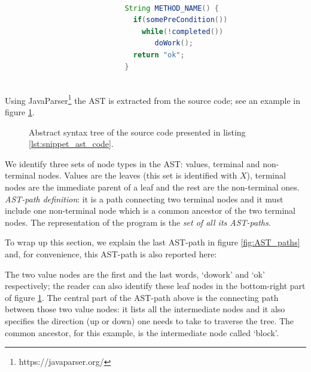 \begin{lstlisting}[caption={Example code to show decomposition}, label={lst:snippet_ast_code},language=Java]

                            String METHOD_NAME() {
                              if(somePreCondition())
                                while(!completed())
                                   doWork();
                              return "ok";
                            }
                            
\end{lstlisting}

Using JavaParser\footnote{https://javaparser.org/} the AST is extracted from the source code; see an example in figure  \ref{fig:AST_graphviz}.


\begin{figure}
 \centering
 \resizebox{\columnwidth}{!}{
 
 }
 \caption[AST for listing \ref{lst:snippet_ast_code}.]{Abstract syntax tree of the source code presented in listing \ref{lst:snippet_ast_code}.}
 \label{fig:AST_graphviz}
\end{figure}

	
We identify three sets of node types in the AST: values, terminal and non-terminal nodes. Values are the leaves (this set is identified with $X$), terminal nodes are the immediate parent of a leaf and the rest are the non-terminal ones.
\textit{AST-path definition}: it is a path connecting two terminal nodes and it must include one non-terminal node which is a common ancestor of the two terminal nodes. 
The representation of the program is the \textit{set of all its AST-paths}. 

To wrap up this section, we explain the last AST-path in figure \ref{fig:AST_paths} and, for convenience, this AST-path is also reported here:

\begin{center}
\end{center}

The two value nodes are the first and the last words, `dowork' and `ok' respectively; the reader can also identify these leaf nodes in the bottom-right part of figure \ref{fig:AST_graphviz}.
The central part of the AST-path above is the connecting path between those two value nodes: it lists all the intermediate nodes and it also specifies the direction (up or down) one needs to take to traverse the tree. The common ancestor, for this example, is the intermediate node called `block'.

